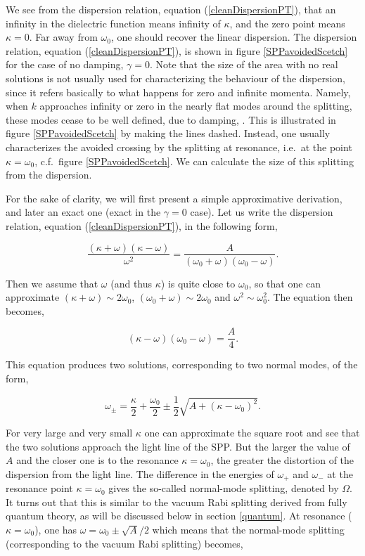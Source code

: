 \documentclass[12pt]{iopart}
\begin{document}
We see from the dispersion relation, equation (\ref{cleanDispersionPT}), that an infinity in the dielectric function means infinity of $\kappa$, and the zero point means $\kappa = 0$. Far away from $\omega_0$, one should recover the linear dispersion. The dispersion relation, equation (\ref{cleanDispersionPT}), is shown in figure \ref{SPPavoidedScetch} for the case of no damping, $\gamma=0$. Note that the size of the area with no real solutions is not usually used for characterizing the behaviour of the dispersion, since it refers basically to what happens for zero and infinite momenta. Namely, when $k$ approaches infinity or zero in the nearly flat modes around the splitting, these modes cease to be well defined, due to damping, \cite{Agranovich2003}. This is illustrated in figure \ref{SPPavoidedScetch} by making the lines dashed. Instead, one usually characterizes the avoided crossing by the splitting at resonance, i.e.\ at the point $\kappa = \omega_0$, c.f.\ figure \ref{SPPavoidedScetch}. We can calculate the size of this splitting from the dispersion. 

For the sake of clarity, we will first present a simple approximative derivation, and later an exact one (exact in the $\gamma=0$ case). Let us write the dispersion relation, equation (\ref{cleanDispersionPT}), in the following form,

\begin{equation}
\frac{(\kappa+\omega)(\kappa-\omega)}{\omega^2} = \frac{A}{(\omega_0+\omega)(\omega_0-\omega)}.
\end{equation}

\noindent Then we assume that $\omega$ (and thus $\kappa$) is quite close to $\omega_0$, so that one can approximate $(\kappa+\omega) \sim 2\omega_0$, $(\omega_0+\omega)\sim 2\omega_0$ and $\omega^2 \sim \omega_0^2$. The equation then becomes,

\begin{equation}
(\kappa-\omega)(\omega_0-\omega)= \frac{A}{4}. \label{apprNodampingPT}
\end{equation}

\noindent This equation produces two solutions, corresponding to two normal modes, of the form,

\begin{equation}
\omega_\pm = \frac{\kappa}{2} + \frac{\omega_0}{2} \pm \frac{1}{2}\sqrt{A+(\kappa-\omega_0)^2}  . \label{apprModesPT}
\end{equation}

For very large and very small $\kappa$ one can approximate the square root and see that the two solutions approach the light line of the SPP. But the larger the value of $A$ and the closer one is to the resonance $\kappa = \omega_0$, the greater the distortion of the dispersion from the light line. The difference in the energies of $\omega_+$ and $\omega_-$ at the resonance point $\kappa = \omega_0$ gives the so-called normal-mode splitting, denoted by $\Omega$. It turns out that this is similar to the vacuum Rabi splitting derived from fully quantum theory, as will be discussed below in section \ref{quantum}. At resonance ($\kappa=\omega_0$), one has $\omega = \omega_0 \pm \sqrt{A}/2$ which means that the normal-mode splitting (corresponding to the vacuum Rabi splitting) becomes,
\end{document}
